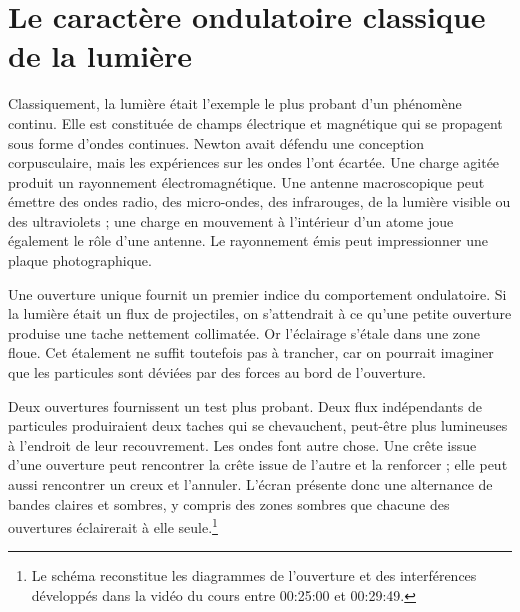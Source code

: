 \section{Le caractère ondulatoire classique de la lumière}

Classiquement, la lumière était l’exemple le plus probant d’un phénomène continu. Elle est constituée de champs électrique et magnétique qui se propagent sous forme d’ondes continues. Newton avait défendu une conception corpusculaire, mais les expériences sur les ondes l’ont écartée. Une charge agitée produit un rayonnement électromagnétique. Une antenne macroscopique peut émettre des ondes radio, des micro-ondes, des infrarouges, de la lumière visible ou des ultraviolets ; une charge en mouvement à l’intérieur d’un atome joue également le rôle d’une antenne. Le rayonnement émis peut impressionner une plaque photographique.

Une ouverture unique fournit un premier indice du comportement ondulatoire. Si la lumière était un flux de projectiles, on s’attendrait à ce qu’une petite ouverture produise une tache nettement collimatée. Or l’éclairage s’étale dans une zone floue. Cet étalement ne suffit toutefois pas à trancher, car on pourrait imaginer que les particules sont déviées par des forces au bord de l’ouverture.

Deux ouvertures fournissent un test plus probant. Deux flux indépendants de particules produiraient deux taches qui se chevauchent, peut-être plus lumineuses à l’endroit de leur recouvrement. Les ondes font autre chose. Une crête issue d’une ouverture peut rencontrer la crête issue de l’autre et la renforcer ; elle peut aussi rencontrer un creux et l’annuler. L’écran présente donc une alternance de bandes claires et sombres, y compris des zones sombres que chacune des ouvertures éclairerait à elle seule.\footnote{Le schéma reconstitue les diagrammes de l’ouverture et des interférences développés dans la vidéo du cours entre 00:25:00 et 00:29:49.}

